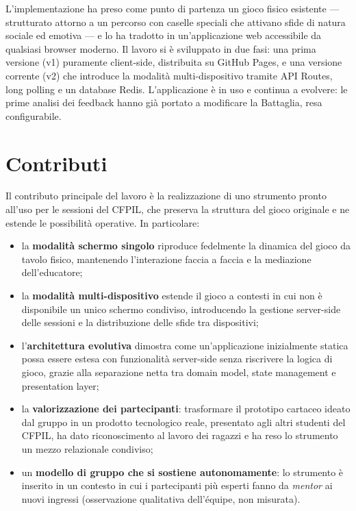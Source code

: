\documentclass[12pt]{report}
\begin{document}
L'implementazione ha preso come punto di partenza un gioco fisico esistente --- strutturato attorno a un percorso con caselle speciali che attivano sfide di natura sociale ed emotiva --- e lo ha tradotto in un'applicazione web accessibile da qualsiasi browser moderno. Il lavoro si è sviluppato in due fasi: una prima versione (v1) puramente client-side, distribuita su GitHub Pages, e una versione corrente (v2) che introduce la modalità multi-dispositivo tramite API Routes, long polling e un database Redis. L'applicazione è in uso e continua a evolvere: le prime analisi dei feedback hanno già portato a modificare la Battaglia, resa configurabile.

\section{Contributi}

Il contributo principale del lavoro è la realizzazione di uno strumento pronto all'uso per le sessioni del CFPIL, che preserva la struttura del gioco originale e ne estende le possibilità operative. In particolare:

\begin{itemize}
    \item la \textbf{modalità schermo singolo} riproduce fedelmente la dinamica del gioco da tavolo fisico, mantenendo l'interazione faccia a faccia e la mediazione dell'educatore;
    \item la \textbf{modalità multi-dispositivo} estende il gioco a contesti in cui non è disponibile un unico schermo condiviso, introducendo la gestione server-side delle sessioni e la distribuzione delle sfide tra dispositivi;
    \item l'\textbf{architettura evolutiva} dimostra come un'applicazione inizialmente statica possa essere estesa con funzionalità server-side senza riscrivere la logica di gioco, grazie alla separazione netta tra domain model, state management e presentation layer;
    \item la \textbf{valorizzazione dei partecipanti}: trasformare il prototipo cartaceo ideato dal gruppo in un prodotto tecnologico reale, presentato agli altri studenti del CFPIL, ha dato riconoscimento al lavoro dei ragazzi e ha reso lo strumento un mezzo relazionale condiviso;
    \item un \textbf{modello di gruppo che si sostiene autonomamente}: lo strumento è inserito in un contesto in cui i partecipanti più esperti fanno da \textit{mentor} ai nuovi ingressi (osservazione qualitativa dell'équipe, non misurata).
\end{itemize}
\end{document}
